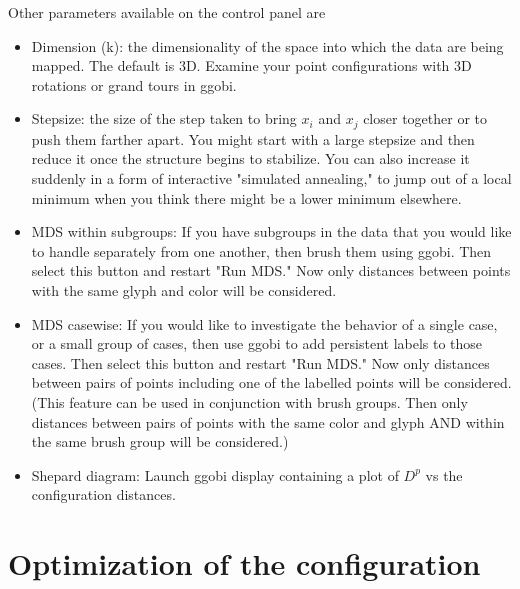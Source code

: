 \documentclass[11pt]{article}
\begin{document}
Other parameters available on the control panel are
\begin{itemize}
\item
Dimension (k): the dimensionality of the space into which the data are
  being mapped.  The default is 3D.  Examine your point configurations
  with 3D rotations or grand tours in ggobi.
\item
Stepsize: the size of the step taken to bring $x_i$ and $x_j$ closer
  together or to push them farther apart.  You might start with a
  large stepsize and then reduce it once the structure begins to
  stabilize.  You can also increase it suddenly in a form of
  interactive "simulated annealing," to jump out of a local minimum
  when you think there might be a lower minimum elsewhere.
\item
MDS within subgroups: If you have subgroups in the data that you would
  like to handle separately from one another, then brush them using
  ggobi.  Then select this button and restart "Run MDS."  Now only
  distances between points with the same glyph and color will be
  considered.
\item
MDS casewise: If you would like to investigate the behavior of a
  single case, or a small group of cases, then use ggobi to add
  persistent labels to those cases.  Then select this button and
  restart "Run MDS."  Now only distances between pairs of points
  including one of the labelled points will be considered.  (This
  feature can be used in conjunction with brush groups.  Then only
  distances between pairs of points with the same color and glyph AND
  within the same brush group will be considered.)
\item
Shepard diagram:  Launch ggobi display containing a plot of $D^p$ vs
  the configuration distances.  
\end{itemize}


\section{Optimization of the configuration}
\end{document}
